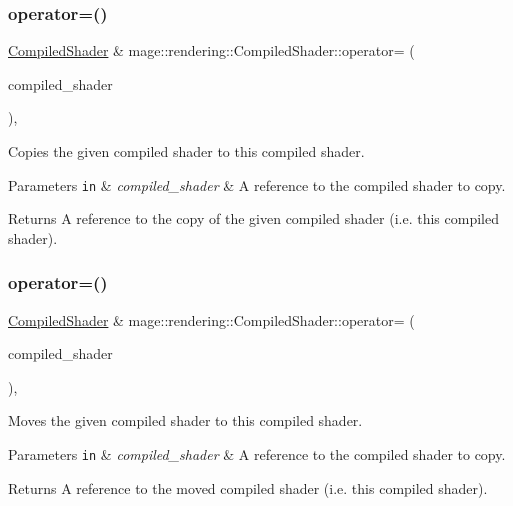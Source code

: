 \subsubsection{\texorpdfstring{operator=()}{operator=()}\hspace{0.1cm}{\footnotesize\ttfamily [1/2]}}
{\footnotesize\ttfamily \hyperlink{classmage_1_1rendering_1_1_compiled_shader}{Compiled\+Shader} \& mage\+::rendering\+::\+Compiled\+Shader\+::operator= (\begin{DoxyParamCaption}\item[{const \hyperlink{classmage_1_1rendering_1_1_compiled_shader}{Compiled\+Shader} \&}]{compiled\+\_\+shader }\end{DoxyParamCaption})\hspace{0.3cm}{\ttfamily [default]}, {\ttfamily [noexcept]}}

Copies the given compiled shader to this compiled shader.


\begin{DoxyParams}[1]{Parameters}
\mbox{\tt in}  & {\em compiled\+\_\+shader} & A reference to the compiled shader to copy. \\
\hline
\end{DoxyParams}
\begin{DoxyReturn}{Returns}
A reference to the copy of the given compiled shader (i.\+e. this compiled shader). 
\end{DoxyReturn}
\hypertarget{classmage_1_1rendering_1_1_compiled_shader_ab4217b5b68c5cc33b6736a844ddfe699}{}\label{classmage_1_1rendering_1_1_compiled_shader_ab4217b5b68c5cc33b6736a844ddfe699} 
\subsubsection{\texorpdfstring{operator=()}{operator=()}\hspace{0.1cm}{\footnotesize\ttfamily [2/2]}}
{\footnotesize\ttfamily \hyperlink{classmage_1_1rendering_1_1_compiled_shader}{Compiled\+Shader} \& mage\+::rendering\+::\+Compiled\+Shader\+::operator= (\begin{DoxyParamCaption}\item[{\hyperlink{classmage_1_1rendering_1_1_compiled_shader}{Compiled\+Shader} \&\&}]{compiled\+\_\+shader }\end{DoxyParamCaption})\hspace{0.3cm}{\ttfamily [default]}, {\ttfamily [noexcept]}}

Moves the given compiled shader to this compiled shader.


\begin{DoxyParams}[1]{Parameters}
\mbox{\tt in}  & {\em compiled\+\_\+shader} & A reference to the compiled shader to copy. \\
\hline
\end{DoxyParams}
\begin{DoxyReturn}{Returns}
A reference to the moved compiled shader (i.\+e. this compiled shader). 
\end{DoxyReturn}
